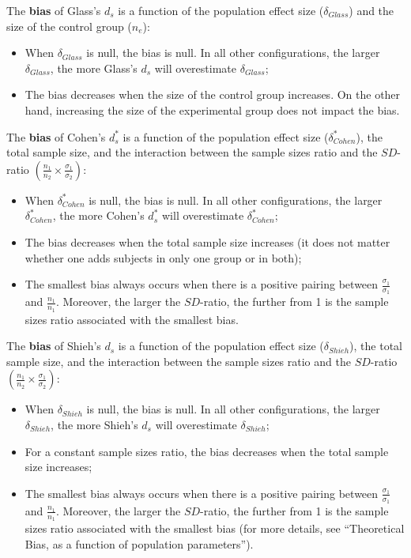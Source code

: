 \documentclass[
  english,
  man,mask]{apa6}
\providecommand{\tightlist}{%
  \setlength{\itemsep}{0pt}\setlength{\parskip}{0pt}}
\begin{document}
The \textbf{bias} of Glass's \(d_s\) is a function of the population effect size (\(\delta_{Glass}\)) and the size of the control group (\(n_e\)):

\begin{itemize}
\tightlist
\item
  When \(\delta_{Glass}\) is null, the bias is null. In all other configurations, the larger \(\delta_{Glass}\), the more Glass's \(d_s\) will overestimate \(\delta_{Glass}\);\\
\item
  The bias decreases when the size of the control group increases. On the other hand, increasing the size of the experimental group does not impact the bias.
\end{itemize}

The \textbf{bias} of Cohen's \(d^*_s\) is a function of the population effect size (\(\delta^*_{Cohen}\)), the total sample size, and the interaction between the sample sizes ratio and the \(SD\)-ratio \(\left(\frac{n_1}{n_2}\times\frac{\sigma_1}{\sigma_2} \right)\):

\begin{itemize}
\tightlist
\item
  When \(\delta^*_{Cohen}\) is null, the bias is null. In all other configurations, the larger \(\delta^*_{Cohen}\), the more Cohen's \(d^*_s\) will overestimate \(\delta^*_{Cohen}\);\\
\item
  The bias decreases when the total sample size increases (it does not matter whether one adds subjects in only one group or in both);
\item
  The smallest bias always occurs when there is a positive pairing between \(\frac{\sigma_1}{\sigma_1}\) and \(\frac{n_1}{n_1}\). Moreover, the larger the \(SD\)-ratio, the further from 1 is the sample sizes ratio associated with the smallest bias.
\end{itemize}

The \textbf{bias} of Shieh's \(d_s\) is a function of the population effect size (\(\delta_{Shieh}\)), the total sample size, and the interaction between the sample sizes ratio and the \(SD\)-ratio \(\left(\frac{n_1}{n_2}\times\frac{\sigma_1}{\sigma_2} \right)\):

\begin{itemize}
\tightlist
\item
  When \(\delta_{Shieh}\) is null, the bias is null. In all other configurations, the larger \(\delta_{Shieh}\), the more Shieh's \(d_s\) will overestimate \(\delta_{Shieh}\);\\
\item
  For a constant sample sizes ratio, the bias decreases when the total sample size increases;\\
\item
  The smallest bias always occurs when there is a positive pairing between \(\frac{\sigma_1}{\sigma_1}\) and \(\frac{n_1}{n_1}\). Moreover, the larger the \(SD\)-ratio, the further from 1 is the sample sizes ratio associated with the smallest bias (for more details, see ``Theoretical Bias, as a function of population parameters'').
\end{itemize}
\end{document}
